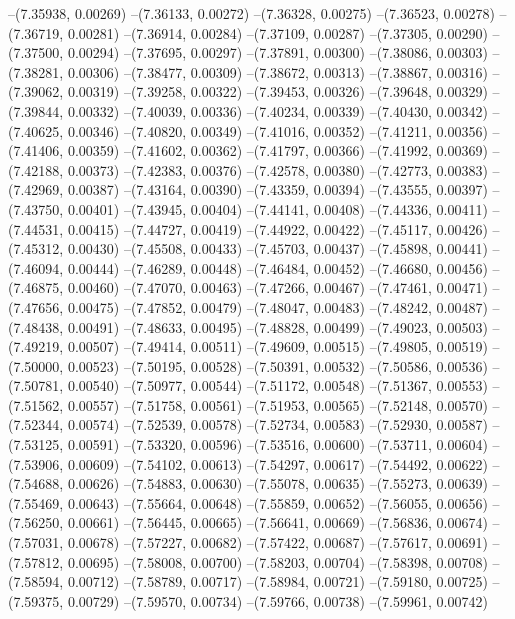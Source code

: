 --(7.35938, 0.00269)
--(7.36133, 0.00272)
--(7.36328, 0.00275)
--(7.36523, 0.00278)
--(7.36719, 0.00281)
--(7.36914, 0.00284)
--(7.37109, 0.00287)
--(7.37305, 0.00290)
--(7.37500, 0.00294)
--(7.37695, 0.00297)
--(7.37891, 0.00300)
--(7.38086, 0.00303)
--(7.38281, 0.00306)
--(7.38477, 0.00309)
--(7.38672, 0.00313)
--(7.38867, 0.00316)
--(7.39062, 0.00319)
--(7.39258, 0.00322)
--(7.39453, 0.00326)
--(7.39648, 0.00329)
--(7.39844, 0.00332)
--(7.40039, 0.00336)
--(7.40234, 0.00339)
--(7.40430, 0.00342)
--(7.40625, 0.00346)
--(7.40820, 0.00349)
--(7.41016, 0.00352)
--(7.41211, 0.00356)
--(7.41406, 0.00359)
--(7.41602, 0.00362)
--(7.41797, 0.00366)
--(7.41992, 0.00369)
--(7.42188, 0.00373)
--(7.42383, 0.00376)
--(7.42578, 0.00380)
--(7.42773, 0.00383)
--(7.42969, 0.00387)
--(7.43164, 0.00390)
--(7.43359, 0.00394)
--(7.43555, 0.00397)
--(7.43750, 0.00401)
--(7.43945, 0.00404)
--(7.44141, 0.00408)
--(7.44336, 0.00411)
--(7.44531, 0.00415)
--(7.44727, 0.00419)
--(7.44922, 0.00422)
--(7.45117, 0.00426)
--(7.45312, 0.00430)
--(7.45508, 0.00433)
--(7.45703, 0.00437)
--(7.45898, 0.00441)
--(7.46094, 0.00444)
--(7.46289, 0.00448)
--(7.46484, 0.00452)
--(7.46680, 0.00456)
--(7.46875, 0.00460)
--(7.47070, 0.00463)
--(7.47266, 0.00467)
--(7.47461, 0.00471)
--(7.47656, 0.00475)
--(7.47852, 0.00479)
--(7.48047, 0.00483)
--(7.48242, 0.00487)
--(7.48438, 0.00491)
--(7.48633, 0.00495)
--(7.48828, 0.00499)
--(7.49023, 0.00503)
--(7.49219, 0.00507)
--(7.49414, 0.00511)
--(7.49609, 0.00515)
--(7.49805, 0.00519)
--(7.50000, 0.00523)
--(7.50195, 0.00528)
--(7.50391, 0.00532)
--(7.50586, 0.00536)
--(7.50781, 0.00540)
--(7.50977, 0.00544)
--(7.51172, 0.00548)
--(7.51367, 0.00553)
--(7.51562, 0.00557)
--(7.51758, 0.00561)
--(7.51953, 0.00565)
--(7.52148, 0.00570)
--(7.52344, 0.00574)
--(7.52539, 0.00578)
--(7.52734, 0.00583)
--(7.52930, 0.00587)
--(7.53125, 0.00591)
--(7.53320, 0.00596)
--(7.53516, 0.00600)
--(7.53711, 0.00604)
--(7.53906, 0.00609)
--(7.54102, 0.00613)
--(7.54297, 0.00617)
--(7.54492, 0.00622)
--(7.54688, 0.00626)
--(7.54883, 0.00630)
--(7.55078, 0.00635)
--(7.55273, 0.00639)
--(7.55469, 0.00643)
--(7.55664, 0.00648)
--(7.55859, 0.00652)
--(7.56055, 0.00656)
--(7.56250, 0.00661)
--(7.56445, 0.00665)
--(7.56641, 0.00669)
--(7.56836, 0.00674)
--(7.57031, 0.00678)
--(7.57227, 0.00682)
--(7.57422, 0.00687)
--(7.57617, 0.00691)
--(7.57812, 0.00695)
--(7.58008, 0.00700)
--(7.58203, 0.00704)
--(7.58398, 0.00708)
--(7.58594, 0.00712)
--(7.58789, 0.00717)
--(7.58984, 0.00721)
--(7.59180, 0.00725)
--(7.59375, 0.00729)
--(7.59570, 0.00734)
--(7.59766, 0.00738)
--(7.59961, 0.00742)
